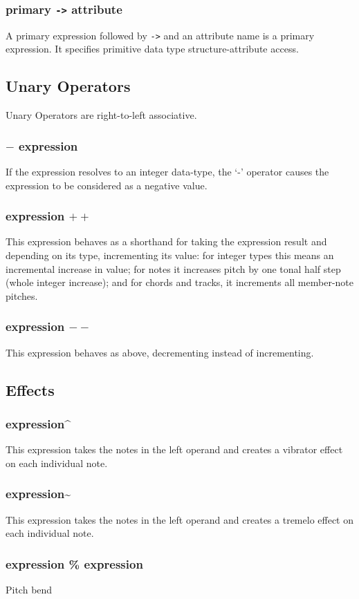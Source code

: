\documentclass[letterpaper]{article}
\begin{document}
\subsubsection{primary \texttt{-\textgreater} attribute}
A primary expression followed by \texttt{-\textgreater} and an attribute name is a primary expression. It specifies primitive data type structure-attribute access.
\subsection{Unary Operators}
Unary Operators are right-to-left associative.
\subsubsection{$-$ expression}
If the expression resolves to an integer data-type, the `-' operator causes the expression to be considered as a negative value.
\subsubsection{expression $++$}
This expression behaves as a shorthand for taking the expression result and depending on its type, incrementing its value: for integer types this means an incremental increase in value; for notes it increases pitch by one tonal half step (whole integer increase); and for chords and tracks, it increments all member-note pitches. 
\subsubsection{expression $--$}
This expression behaves as above, decrementing instead of incrementing.
\subsection{Effects}
\subsubsection{expression\textasciicircum}
This expression takes the notes in the left operand and creates a vibrator effect on each individual note. 
\subsubsection{expression\textasciitilde}
This expression takes the notes in the left operand and creates a tremelo effect on each individual note.
\subsubsection{expression \% expression}
Pitch bend
\end{document}

